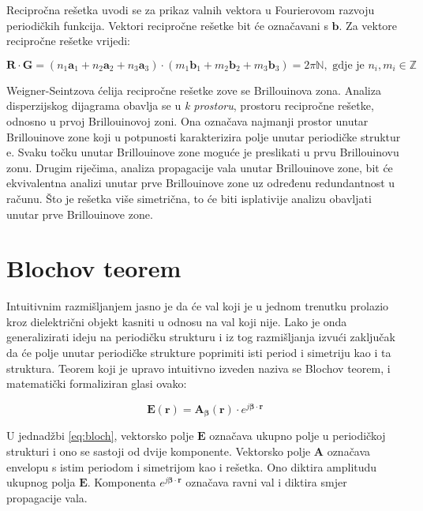 \documentclass[utf8, seminar]{fer}
\begin{document}
Recipročna rešetka uvodi se za prikaz valnih vektora u Fourierovom razvoju
periodičkih funkcija. Vektori recipročne rešetke bit će označavani s $\mathbf{b}$.
Za vektore recipročne rešetke vrijedi:

\begin{equation}
	\mathbf{R} \cdot \mathbf{G} =
	(n_1\mathbf{a}_1 + n_2\mathbf{a}_2 + n_3\mathbf{a}_3)
	\cdot
	(m_1\mathbf{b}_1 + m_2\mathbf{b}_2 + m_3\mathbf{b}_3) = 2 \pi \mathbb{N},
		\text{ gdje je }n_i, m_i \in \mathbb{Z}
\end{equation}


Weigner-Seintzova ćelija recipročne rešetke zove se Brillouinova zona. Analiza
disperzijskog dijagrama obavlja se u \textit{k prostoru}, prostoru recipročne
rešetke, odnosno u prvoj Brillouinovoj zoni. Ona označava najmanji
prostor unutar Brillouinove zone koji u potpunosti karakterizira polje unutar
periodičke struktur e. Svaku točku unutar Brillouinove zone moguće je preslikati
u prvu Brillouinovu zonu. Drugim riječima, analiza propagacije vala unutar
Brillouinove zone, bit će ekvivalentna analizi unutar prve Brillouinove zone uz
određenu redundantnost u računu. Što je rešetka više simetrična, to će biti
isplativije analizu obavljati unutar prve Brillouinove zone.


\section{Blochov teorem}

Intuitivnim razmišljanjem jasno je da će val koji je u jednom trenutku prolazio
kroz dielektrični objekt kasniti u odnosu na val koji nije. Lako je onda
generalizirati ideju na periodičku strukturu i iz tog razmišljanja izvući
zaključak da će polje unutar periodičke strukture poprimiti isti period i
simetriju kao i ta struktura. Teorem koji je upravo intuitivno izveden naziva se
Blochov teorem, i matematički formaliziran glasi ovako:

\begin{equation} \label{eq:bloch}
	\mathbf{E}(\mathbf{r}) =
	\mathbf{A}_\mathbf{\beta}(\mathbf{r}) \cdot
		e^{j \mathbf{\beta} \cdot \mathbf{r}}
\end{equation}

U jednadžbi \ref{eq:bloch}, vektorsko polje $\mathbf{E}$ označava ukupno polje
u periodičkoj strukturi i ono se sastoji od dvije komponente. Vektorsko polje
$\mathbf{A}$ označava envelopu s istim periodom i simetrijom kao i rešetka.
Ono diktira amplitudu ukupnog polja $\mathbf{E}$.
Komponenta ${e^{j \mathbf{\beta} \cdot \mathbf{r}}}$ označava ravni val i diktira
smjer propagacije vala.
\end{document}
